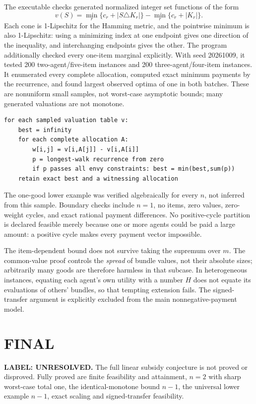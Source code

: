 \documentclass[11pt,a4paper]{article}
\theoremstyle{remark}\newtheorem{remark}[theorem]{Remark}
\begin{document}
The executable checks generated normalized integer set functions of the form
\[
v(S)=\min_r\{c_r+|S\triangle K_r|\}-\min_r\{c_r+|K_r|\}.
\]
Each cone is 1-Lipschitz for the Hamming metric, and the pointwise minimum is also 1-Lipschitz: using a minimizing index at one endpoint gives one direction of the inequality, and interchanging endpoints gives the other. The program additionally checked every one-item marginal explicitly. With seed 20261009, it tested 200 two-agent/five-item instances and 200 three-agent/four-item instances. It enumerated every complete allocation, computed exact minimum payments by the recurrence, and found largest observed optima of one in both batches. These are nonuniform small samples, not worst-case asymptotic bounds; many generated valuations are not monotone.
\begin{lstlisting}
for each sampled valuation table v:
    best = infinity
    for each complete allocation A:
        w[i,j] = v[i,A[j]] - v[i,A[i]]
        p = longest-walk recurrence from zero
        if p passes all envy constraints: best = min(best,sum(p))
    retain exact best and a witnessing allocation
\end{lstlisting}
The one-good lower example was verified algebraically for every $n$, not inferred from this sample. Boundary checks include $n=1$, no items, zero values, zero-weight cycles, and exact rational payment differences. No positive-cycle partition is declared feasible merely because one or more agents could be paid a large amount: a positive cycle makes every payment vector impossible.

The item-dependent bound does not survive taking the supremum over $m$. The common-value proof controls the \emph{spread} of bundle values, not their absolute sizes; arbitrarily many goods are therefore harmless in that subcase. In heterogeneous instances, equating each agent's own utility with a number $H$ does not equate its evaluations of others' bundles, so that tempting extension fails. The signed-transfer argument is explicitly excluded from the main nonnegative-payment model.

\section{FINAL}
\textbf{LABEL: UNRESOLVED.}
The full linear subsidy conjecture is not proved or disproved. Fully proved are finite feasibility and attainment, $n=2$ with sharp worst-case total one, the identical-monotone bound $n-1$, the universal lower example $n-1$, exact scaling and signed-transfer feasibility.
\end{document}
